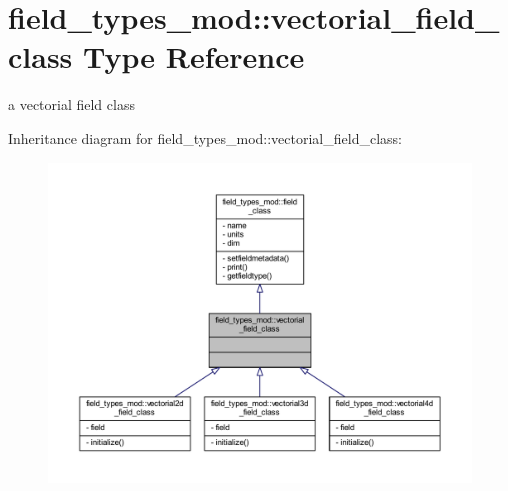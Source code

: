 \hypertarget{structfield__types__mod_1_1vectorial__field__class}{}\section{field\+\_\+types\+\_\+mod\+:\+:vectorial\+\_\+field\+\_\+class Type Reference}
\label{structfield__types__mod_1_1vectorial__field__class}


a vectorial field class  




Inheritance diagram for field\+\_\+types\+\_\+mod\+:\+:vectorial\+\_\+field\+\_\+class\+:\nopagebreak
\begin{figure}[H]
\begin{center}
\leavevmode
\includegraphics[width=350pt]{structfield__types__mod_1_1vectorial__field__class__inherit__graph}
\end{center}
\end{figure}



